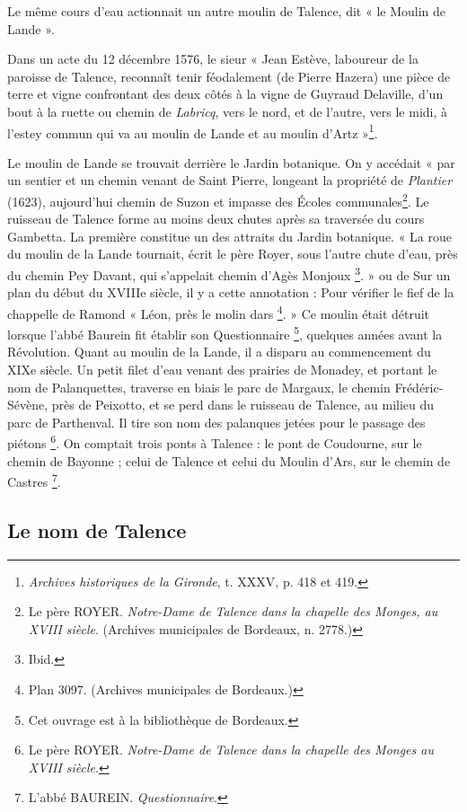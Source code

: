 Le même cours d'eau actionnait un autre moulin de Talence, dit « le Moulin de Lande ».

Dans un acte du 12 décembre 1576, le sieur « Jean Estève, laboureur de la paroisse de Talence, reconnaît tenir féodalement (de Pierre Hazera) une pièce de terre et vigne confrontant des deux côtés à la vigne de Guyraud Delaville, d'un bout à la ruette ou chemin de \textit{Labricq}, vers le nord, et de l'autre, vers le midi, à l'estey commun qui va au moulin de Lande et au moulin d'Artz »\footnote{\textit{Archives historiques de la Gironde}, t. XXXV, p. 418 et 419.}.

Le moulin de Lande se trouvait derrière le Jardin botanique. On y accédait « par un sentier et un chemin venant de Saint Pierre, longeant la propriété de \textit{Plantier} (1623), aujourd'hui chemin de Suzon et impasse des Écoles communales\footnote{Le père ROYER. \textit{Notre-Dame de Talence dans la chapelle des Monges, au XVIII\ieme{} siècle}. (Archives municipales de Bordeaux, n. 2778.)}. Le ruisseau de Talence forme au moins deux chutes après sa traversée du cours Gambetta. La première constitue un des attraits du Jardin botanique. « La roue du moulin de la Lande tournait, écrit le père Royer, sous l'autre chute d'eau, près du chemin Pey Davant, qui s'appelait chemin d'Agès Monjoux \footnote{Ibid.}. » ou de Sur un plan du début du XVIIIe siècle, il y a cette annotation : Pour vérifier le fief de la chappelle de Ramond « Léon, près le molin dars \footnote{Plan 3097. (Archives municipales de Bordeaux.)}. » Ce moulin était détruit lorsque l'abbé Baurein fit établir son Questionnaire \footnote{Cet ouvrage est à la bibliothèque de Bordeaux.}, quelques années avant la Révolution. Quant au moulin de la Lande, il a disparu au commencement du XIXe siècle. Un petit filet d'eau venant des prairies de Monadey, et portant le nom de Palanquettes, traverse en biais le parc de Margaux, le chemin Frédéric-Sévène, près de Peixotto, et se perd dans le ruisseau de Talence, au milieu du parc de Parthenval. Il tire son nom des palanques jetées pour le passage des piétons \footnote{Le père ROYER. \textit{Notre-Dame de Talence dans la chapelle des Monges au XVIII\ieme{} siècle}.}. On comptait trois ponts à Talence : le pont de Coudourne, sur le chemin de Bayonne ; celui de Talence et celui du Moulin d'Ars, sur le chemin de Castres \footnote{L'abbé BAUREIN. \textit{Questionnaire}.}. 

\subsection{Le nom de Talence}

